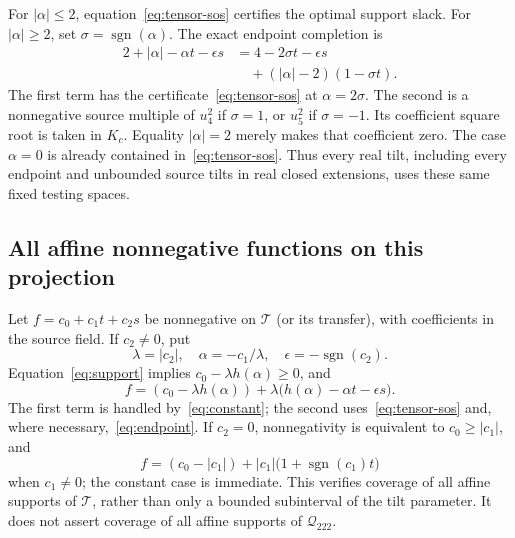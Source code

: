 \documentclass[11pt]{article}
\newcommand{\Q}{{\mathcal Q_{222}}}
\newcommand{\T}{\mathcal T}
\begin{document}
For $|\alpha|\le2$, equation~\eqref{eq:tensor-sos} certifies the optimal support slack. For $|\alpha|\ge2$, set $\sigma=\operatorname{sgn}(\alpha)$. The exact endpoint completion is
\begin{equation}\label{eq:endpoint}
 \begin{aligned}
 2+|\alpha|-\alpha t-\epsilon s
 &=4-2\sigma t-\epsilon s\\
 &\quad+(|\alpha|-2)(1-\sigma t).
 \end{aligned}
\end{equation}
The first term has the certificate~\eqref{eq:tensor-sos} at $\alpha=2\sigma$. The second is a nonnegative source multiple of $u_4^2$ if $\sigma=1$, or $u_5^2$ if $\sigma=-1$. Its coefficient square root is taken in $K_c$. Equality $|\alpha|=2$ merely makes that coefficient zero. The case $\alpha=0$ is already contained in~\eqref{eq:tensor-sos}. Thus every real tilt, including every endpoint and unbounded source tilts in real closed extensions, uses these same fixed testing spaces.

\subsection{All affine nonnegative functions on this projection}
Let $f=c_0+c_1t+c_2s$ be nonnegative on $\T$ (or its transfer), with coefficients in the source field. If $c_2\ne0$, put
\[
 \lambda=|c_2|,\quad \alpha=-c_1/\lambda,
 \quad\epsilon=-\operatorname{sgn}(c_2).
\]
Equation~\eqref{eq:support} implies $c_0-\lambda h(\alpha)\ge0$, and
\[
 f=(c_0-\lambda h(\alpha))
       +\lambda\bigl(h(\alpha)-\alpha t-\epsilon s\bigr).
\]
The first term is handled by~\eqref{eq:constant}; the second uses~\eqref{eq:tensor-sos} and, where necessary,~\eqref{eq:endpoint}. If $c_2=0$, nonnegativity is equivalent to $c_0\ge|c_1|$, and
\[
 f=(c_0-|c_1|)+|c_1|\bigl(1+\operatorname{sgn}(c_1)t\bigr)
\]
when $c_1\ne0$; the constant case is immediate. This verifies coverage of all affine supports of $\T$, rather than only a bounded subinterval of the tilt parameter. It does not assert coverage of all affine supports of $\Q$.
\end{document}
